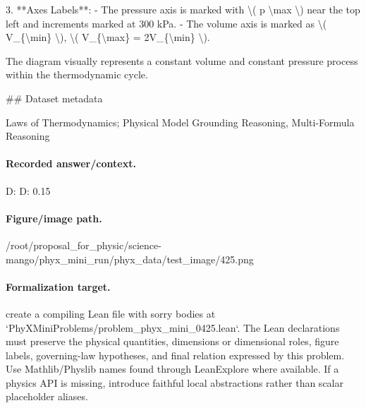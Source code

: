 3. **Axes Labels**:
   - The pressure axis is marked with \textbackslash{}( p \textbackslash{}max \textbackslash{}) near the top left and increments marked at 300 kPa.
   - The volume axis is marked as \textbackslash{}( V\_\{\textbackslash{}min\} \textbackslash{}), \textbackslash{}( V\_\{\textbackslash{}max\} = 2V\_\{\textbackslash{}min\} \textbackslash{}).

The diagram visually represents a constant volume and constant pressure process within the thermodynamic cycle.

\#\# Dataset metadata

Laws of Thermodynamics; Physical Model Grounding Reasoning, Multi-Formula Reasoning

\paragraph{Recorded answer/context.}
D: D: 0.15

\paragraph{Figure/image path.}
/root/proposal\_for\_physic/science-mango/phyx\_mini\_run/phyx\_data/test\_image/425.png

\paragraph{Formalization target.}
create a compiling Lean file with sorry bodies at `PhyXMiniProblems/problem\_phyx\_mini\_0425.lean`. The Lean declarations must preserve the physical quantities, dimensions or dimensional roles, figure labels, governing-law hypotheses, and final relation expressed by this problem.
Use Mathlib/Physlib names found through LeanExplore where available. If a physics API is missing, introduce faithful local abstractions rather than scalar placeholder aliases.

